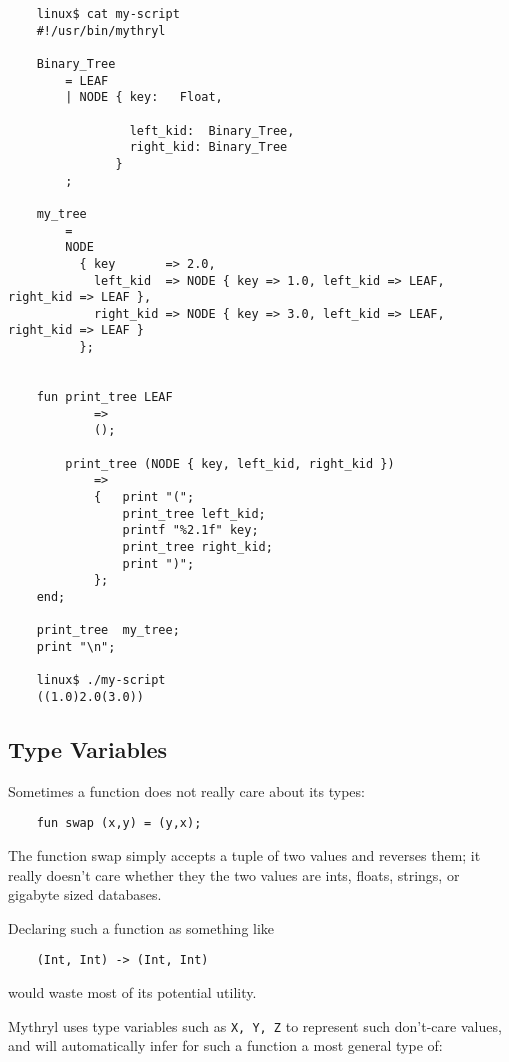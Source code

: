 \begin{verbatim}
    linux$ cat my-script
    #!/usr/bin/mythryl

    Binary_Tree
        = LEAF
        | NODE { key:   Float,

                 left_kid:  Binary_Tree,
                 right_kid: Binary_Tree
               }
        ;

    my_tree
        =
        NODE
          { key       => 2.0,
            left_kid  => NODE { key => 1.0, left_kid => LEAF, right_kid => LEAF },
            right_kid => NODE { key => 3.0, left_kid => LEAF, right_kid => LEAF }
          };


    fun print_tree LEAF
            =>
            ();

        print_tree (NODE { key, left_kid, right_kid })
            =>
            {   print "(";
                print_tree left_kid;
                printf "%2.1f" key;
                print_tree right_kid;
                print ")";
            };
    end;

    print_tree  my_tree;
    print "\n";

    linux$ ./my-script
    ((1.0)2.0(3.0))
\end{verbatim}

\cutend*

\subsection{Type Variables}
\label{section:ref:types:type-variables}
Sometimes a function does not really care about its types:

\begin{verbatim}
    fun swap (x,y) = (y,x);
\end{verbatim}

The function swap simply accepts a tuple of two values  
and reverses them;  it really doesn't care whether they 
the two values are ints, floats, strings, or gigabyte 
sized databases.

Declaring such a function as something like

\begin{verbatim}
    (Int, Int) -> (Int, Int)
\end{verbatim}

would waste most of its potential utility.

Mythryl uses type variables such as {\tt X, Y, Z} to 
represent such don't-care values, and will automatically 
infer for such a function a most general type of:

